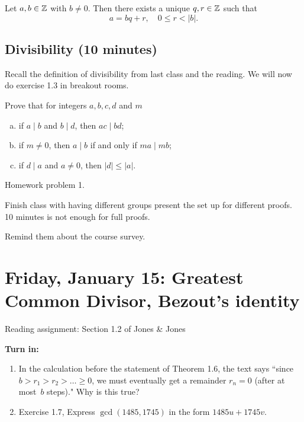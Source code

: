 \documentclass[letterpaper, 11 pt]{article}
\begin{document}
\begin{cor}[Corollary 1.2]
 Let $a,b\in\mathbb Z$ with $b\neq0$. Then there exists a unique $q,r\in\mathbb Z$ such that \[a=bq+r, \quad 0\leq r <|b|.\]
\end{cor}
 


 \subsection{Divisibility (10 minutes)}
 Recall the definition of divisibility from last class and the reading. We will now do exercise 1.3 in breakout rooms.
 
\begin{br}
Prove that for integers $a,b,c,d$ and $m$
\begin{enumerate}[(a)]
\item if $a\mid b$ and $b\mid d$, then $ac\mid bd$;
\item if $m\neq 0$, then $a\mid b$ if and only if $ma\mid mb$;
\item if $d\mid a$ and $a\neq 0$, then $|d|\leq|a|$.
\end{enumerate}
 \end{br}
 
\begin{solution}
 Homework problem 1.
\end{solution}
 
 
Finish class with having different groups present the set up for different proofs. 10 minutes is not enough for full proofs. 

Remind them about the course survey.



\section{Friday, January 15: Greatest Common Divisor, Bezout's identity}

 Reading assignment: Section 1.2 of Jones \& Jones
 
 {\bf Turn in:} 
\begin{enumerate}
 \item In the calculation before the statement of Theorem 1.6, the text says ``since $b>r_1>r_2>\dots\geq0$, we must eventually get a remainder $r_n=0$ (after at most $b$ steps)." Why is this true?
 \item Exercise 1.7, Express $\gcd(1485, 1745)$ in the form $1485u+1745v$.
\end{enumerate}
 
\end{document}
